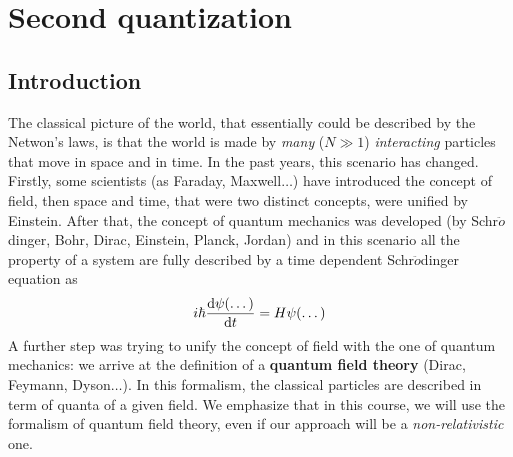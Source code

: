 \documentclass[../main/main.tex]{subfiles}
\begin{document}
\chapter{Second quantization}


\section{Introduction}
The classical picture of the world, that essentially could be described by the Netwon's laws, is that the world is made by \emph{many} (\( N \gg 1 \)) \emph{interacting} particles that move in space and in time.
In the past years, this scenario has changed. Firstly, some scientists (as Faraday, Maxwell\( \dots \)) have introduced the concept of field, then space and time, that were two distinct concepts, were unified by Einstein. After that, the concept of quantum mechanics was developed (by Schr$\ddot{o}$dinger, Bohr, Dirac, Einstein, Planck, Jordan) and in this scenario all the property of a system are fully described by a time dependent Schr$\ddot{o}$dinger equation as
\begin{equation*}
  i \hbar \dv{\psi(\dots)}{t}  = H \psi (\dots)
\end{equation*}
A further step was trying to unify the concept of field with the one of quantum mechanics: we arrive at the definition of a \textbf{quantum field theory} (Dirac, Feymann, Dyson\( \dots \)). In this formalism, the classical particles are described in term of quanta of a given field.
We emphasize that in this course, we will use the formalism of quantum field theory, even if our approach will be a \emph{non-relativistic} one.
\end{document}
